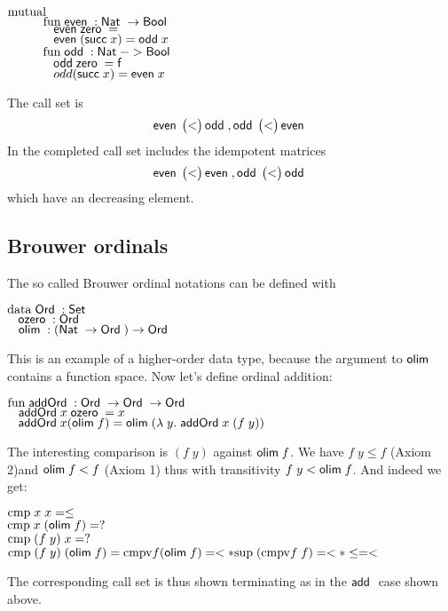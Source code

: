 \begin{bsp}
$\mathrm{mutual}\;$\\
$\spcx \fun \even : \Nat \ra \Bool$\\
$\spcx \spc \even \zero = \tt $\\
$\spcx \spc \even (\suc x) = \odd x $\\
$\spcx \fun \odd : \Nat -> \Bool$\\
$\spcx \spc \odd \zero = \ff$\\
$\spcx \spc  odd (\suc x) = \even x$
\end{bsp}
The call set is 
\[
\mathsf{even}\; \begin{pmatrix}
< \\
\end{pmatrix}\mathsf{odd}\;
, 
\mathsf{odd}\; \begin{pmatrix}
< \\
\end{pmatrix}\mathsf{even}\;
\] 
In the completed call set includes the idempotent matrices
\[
\mathsf{even}\; \begin{pmatrix}
< \\
\end{pmatrix}\mathsf{even}\;
, 
\mathsf{odd}\; \begin{pmatrix}
< \\
\end{pmatrix}\mathsf{odd}\;
\] 
which have an decreasing element.
\subsection{Brouwer ordinals}
The so called Brouwer ordinal notations can be defined with
\begin{bsp}
$\mathrm{data}\; \mathsf{Ord}\; : \mathsf{Set}$ \\
$\hspace*{3mm} \mathsf{ozero}\; : \mathsf{Ord}\; $\\
$\hspace*{3mm} \mathsf{olim}\; : (\mathsf{Nat}\; \rightarrow \mathsf{Ord}\; ) \rightarrow \mathsf{Ord}\; $
\end{bsp}
This is an example of a higher-order data type, because the argument to $\mathsf{olim}\;$ contains a function space.
Now let's define ordinal addition:
\begin{bsp}
$\mathrm{fun}\; \mathsf{addOrd}\; : \mathsf{Ord}\; \rightarrow \mathsf{Ord}\; \rightarrow \mathsf{Ord}\;$\\
$\hspace*{3mm} \mathsf{addOrd}\; x \; \mathsf{ozero}\; = x $\\
$\hspace*{3mm} \mathsf{addOrd}\; x (\mathsf{olim}\; f) = \mathsf{olim}\; ( \lambda\; y .\; \mathsf{addOrd}\;  x \; (f \; y))  $
\end{bsp}
The interesting comparison is $(f \; y)$ against $\mathsf{olim}\; f$.
We have  $f \; y \leq f$ (Axiom 2)and $\mathsf{olim}\; f < f $ (Axiom 1) thus with transitivity $ f\; y < \mathsf{olim}\; f$.
And indeed we get:
\begin{bsp}
$\mathrm{cmp}\; x \; x = \leq $\\
$\mathrm{cmp}\; x \; (\mathsf{olim}\; f) = ? $\\
$\mathrm{cmp}\; (f \; y) \; x = ? $\\
$\mathrm{cmp}\; (f \; y) \; (\mathsf{olim}\; f) = \mathrm{cmpv} f (\mathsf{olim}\; f) = < * \mathrm{sup}\; (\mathrm{cmpv} f \; f) = < * \leq = < $ 
\end{bsp}
The corresponding call set is thus shown terminating as in the $\mathsf{add}\;$ case shown above.
